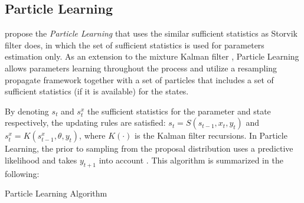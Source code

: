 \subsection{Particle Learning}

\cite{carvalho2010particle} propose the  \textit{Particle Learning} that uses the similar sufficient statistics as Storvik filter does, in which the set of sufficient statistics is used for parameters estimation only. As an extension to the mixture Kalman filter \citep{chen2000mixture}, Particle Learning allows parameters learning throughout the process and utilize a resampling propagate framework together with a set of particles that includes a set of sufficient statistics (if it is available) for the states. 

By denoting $s_t$ and $s_t^x$ the sufficient statistics for the parameter and state respectively, the updating rules are satisfied: $s_t=S(s_{t-1},x_t,y_t)$ and $s_t^x=K\left(s_{t-1}^x,\theta,y_t\right)$, where $K(\cdot)$ is the Kalman filter recursions. In Particle Learning, the prior to sampling from the proposal distribution uses a predictive likelihood and takes $y_{t+1}$ into account \citep{vieira2016online}. This algorithm is summarized in the following: 
\begin{algorithm}[h]
\SetAlgoLined 
\caption{Particle Learning Algorithm}\label{algorithmPL}
\end{algorithm}

